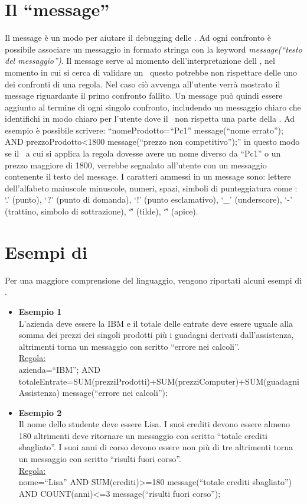 \section{Il ``message''}
Il message \`e un modo per aiutare il debugging delle \br. Ad ogni confronto \`e possibile associare un messaggio in formato stringa con la keyword \textit{message(``testo del messaggio'')}. Il message serve al momento dell'interpretazione dell \br, nel momento in cui si cerca di validare un \bo\ questo potrebbe non rispettare delle uno dei confronti di una regola. Nel caso ci\`o avvenga all'utente verr\`a mostrato il message riguardante il primo confronto fallito. Un message pu\`o quindi essere aggiunto al termine di ogni singolo confronto, includendo un messaggio chiaro che identifichi in modo chiaro per l'utente dove il \bo\ non rispetta una parte della \br. Ad esempio \`e possibile scrivere: ``nomeProdotto=``Pc1'' message(``nome errato''); AND prezzoProdotto\textless1800 message(``prezzo non competitivo'');'' in questo modo se il \bo\ a cui si applica la regola dovesse avere un nome diverso da ``Pc1'' o un prezzo maggiore di 1800, verrebbe segnalato all'utente con un messaggio contenente il testo del message. I caratteri ammessi in un message sono: lettere dell'alfabeto maiuscole minuscole, numeri, spazi, simboli di punteggiatura come : `.' (punto),  `?' (punto di domanda),  `!' (punto esclamativo),  `\_' (underscore),  `-' (trattino, simbolo di sottrazione),  `\~' (tilde), `\^' (apice).


\section{Esempi di \br}
Per una maggiore comprensione del linguaggio, vengono riportati alcuni esempi di \br.
\begin{itemize}
\item \textbf{Esempio 1} \\
L'azienda deve essere la IBM e il totale delle entrate deve essere uguale alla somma dei prezzi dei singoli prodotti pi\`u i guadagni derivati dall'assistenza, altrimenti torna un messaggio con scritto ``errore nei calcoli''. \\
\underline{Regola:} \\
azienda=``IBM''; AND totaleEntrate=SUM(prezziProdotti)+SUM(prezziComputer)+SUM(guadagniAssistenza) message(``errore nei calcoli'');
\item \textbf{Esempio 2} \\
Il nome dello studente deve essere Lisa. I suoi crediti devono essere almeno 180 altrimenti deve ritornare un messaggio con scritto ``totale crediti sbagliato''. I suoi anni di corso devono essere non pi\`u di tre altrimenti torna un messaggio con scritto ``risulti fuori corso''.  \\
\underline{Regola:} \\
nome=``Lisa'' AND SUM(crediti)\textgreater =180 message(``totale crediti sbagliato'') AND COUNT(anni)\textless =3 message(``risulti fuori corso'');
\end{itemize}

